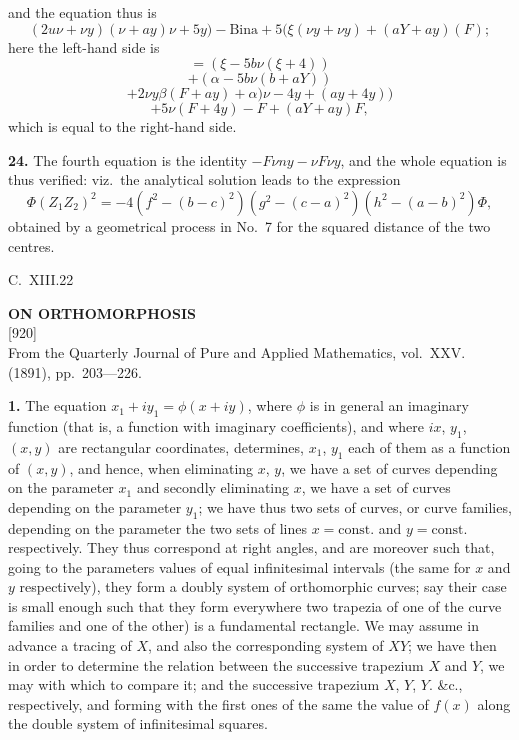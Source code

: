 \documentclass[11pt,a4paper]{article}
\newcommand{\paper}[4]{%
  \newpage
  \begin{center}
    {\large\bfseries #2}\\[0.5em]
    {\small [#1]}\\[0.3em]
    {\small #3}
  \end{center}
  \vspace{0.5em}
}
\begin{document}
and the equation thus is
\[
(2u\nu + \nu y)(\nu + a y)\nu + 5 y) - \text{Bina} + 5(\xi(\nu y + \nu y) + (a Y + a y)(F);
\]
here the left-hand side is
\[
= (\xi - 5b\nu(\xi + 4))
\]
\[
+ (\alpha - 5b\nu(b + a Y))
\]
\[
+ 2\nu y\beta(F + a y) + \alpha)\nu - 4y + (a y + 4y))
\]
\[
+ 5\nu(F + 4y) - F + (a Y + a y)F,
\]
which is equal to the right-hand side.

\textbf{24.} The fourth equation is the identity $- F\nu n y - \nu F\nu y$, and the whole equation is thus verified: viz.\ the analytical solution leads to the expression
\[
\Phi (Z_1 Z_2)^2 = - 4 (f^2 - (b - c)^2) (g^2 - (c - a)^2) (h^2 - (a - b)^2) \Phi,
\]
obtained by a geometrical process in No.\ 7 for the squared distance of the two centres.

\hspace*{\fill} C.\ XIII.\hfill 22

\newpage
\paper{920}{ON ORTHOMORPHOSIS}{From the Quarterly Journal of Pure and Applied Mathematics, vol.~XXV. (1891), pp.~203---226.}{}

\textbf{1.} The equation $x_1 + iy_1 = \phi (x + iy)$, where $\phi$ is in general an imaginary function (that is, a function with imaginary coefficients), and where $ix$, $y_1$, $(x, y)$ are rectangular coordinates, determines, $x_1$, $y_1$ each of them as a function of $(x, y)$, and hence, when eliminating $x$, $y$, we have a set of curves depending on the parameter $x_1$ and secondly eliminating $x$, we have a set of curves depending on the parameter $y_1$; we have thus two sets of curves, or curve families, depending on the parameter the two sets of lines $x = \text{const.}$ and $y = \text{const.}$ respectively. They thus correspond at right angles, and are moreover such that, going to the parameters values of equal infinitesimal intervals (the same for $x$ and $y$ respectively), they form a doubly system of orthomorphic curves; say their case is small enough such that they form everywhere two trapezia of one of the curve families and one of the other) is a fundamental rectangle. We may assume in advance a tracing of $X$, and also the corresponding system of $XY$; we have then in order to determine the relation between the successive trapezium $X$ and $Y$, we may with which to compare it; and the successive trapezium $X$, $Y$, $Y$. \&c., respectively, and forming with the first ones of the same the value of $f(x)$ along the double system of infinitesimal squares.
\end{document}
